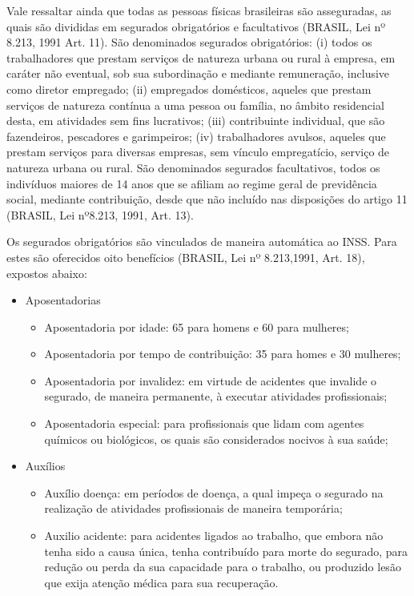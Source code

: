 \begin{apendicesenv}
Vale ressaltar ainda que todas as pessoas físicas brasileiras são asseguradas, as quais são divididas em segurados obrigatórios e facultativos (BRASIL, Lei nº 8.213, 1991 Art. 11). São denominados segurados obrigatórios: (i) todos os trabalhadores que prestam serviços de natureza urbana ou rural à empresa, em caráter não eventual, sob sua subordinação e mediante remuneração, inclusive como diretor empregado; (ii) empregados domésticos, aqueles que prestam serviços de natureza contínua a uma pessoa ou família, no âmbito residencial desta, em atividades sem fins lucrativos; (iii) contribuinte individual, que são fazendeiros, pescadores e garimpeiros; (iv) trabalhadores avulsos, aqueles que prestam serviços para diversas empresas, sem vínculo empregatício, serviço de natureza urbana ou rural. São denominados segurados facultativos, todos os indivíduos maiores de 14 anos que se afiliam ao regime geral de previdência social, mediante contribuição, desde que não incluído nas disposições do artigo 11 (BRASIL, Lei nº8.213, 1991, Art. 13).

Os segurados obrigatórios são vinculados de maneira automática ao INSS. Para estes são oferecidos oito benefícios (BRASIL, Lei nº 8.213,1991, Art. 18), expostos abaixo:

\begin{itemize}
\item Aposentadorias

		\begin{itemize}
		\item Aposentadoria por idade: 65 para homens e 60 para mulheres;
		\item Aposentadoria por tempo de contribuição: 35 para homes e 30 mulheres;
		\item Aposentadoria por invalidez: em virtude de acidentes que invalide o segurado, de maneira permanente, à executar atividades profissionais;
		\item Aposentadoria especial: para profissionais que lidam com agentes químicos ou biológicos, os quais são considerados nocivos à sua saúde;

		\end{itemize}
\item Auxílios

		\begin{itemize}
		\item Auxílio doença: em períodos de doença, a qual impeça o segurado na realização de atividades profissionais de maneira temporária;
		\item Auxilio acidente: para acidentes ligados ao trabalho, que embora não tenha sido a causa única, tenha contribuído para morte do segurado, para redução ou perda da sua capacidade para o trabalho, ou produzido lesão que exija atenção médica para sua recuperação.


\end{itemize}
\end{itemize}
\end{apendicesenv}
